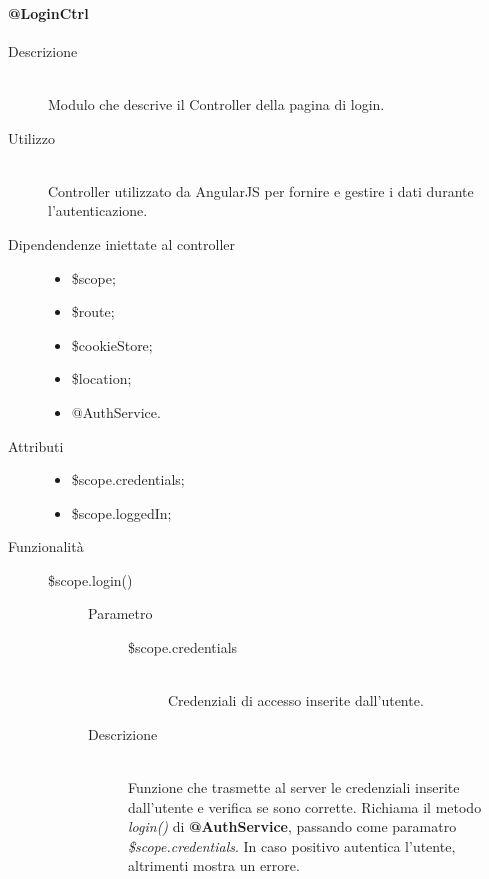 \paragraph{@LoginCtrl}
\begin{description}
 \item[Descrizione] \hfill \\
 Modulo che descrive il Controller della pagina di login.
 
 \item[Utilizzo] \hfill \\
 Controller utilizzato da AngularJS per fornire e gestire i dati durante l'autenticazione.
 
 \item[Dipendendenze iniettate al controller] \hfill
 \begin{itemize}
  \item \$scope;
  \item \$route;
  \item \$cookieStore;
  \item \$location;
  \item @AuthService.
  
 \end{itemize}
 
 \item[Attributi] \hfill
 \begin{itemize}
 \item \$scope.credentials;
 \item \$scope.loggedIn;
 \end{itemize}
 
 \item[Funzionalità] \hfill
 \begin{description}
  \item[\$scope.login()] \hfill
  \begin{description}
  	\item[Parametro] \hfill
  	\begin{description}
  		\item[\$scope.credentials] \hfill \\
  		Credenziali di accesso inserite dall'utente.
  	\end{description}
  	\item[Descrizione] \hfill \\
  	Funzione che trasmette al server le credenziali inserite dall'utente e verifica se sono corrette. Richiama il metodo \textit{login()} di \textbf{@AuthService}, passando come paramatro \textit{\$scope.credentials}.
  	In caso positivo autentica l'utente, altrimenti mostra un errore.
  \end{description}
 \end{description}
\end{description}

